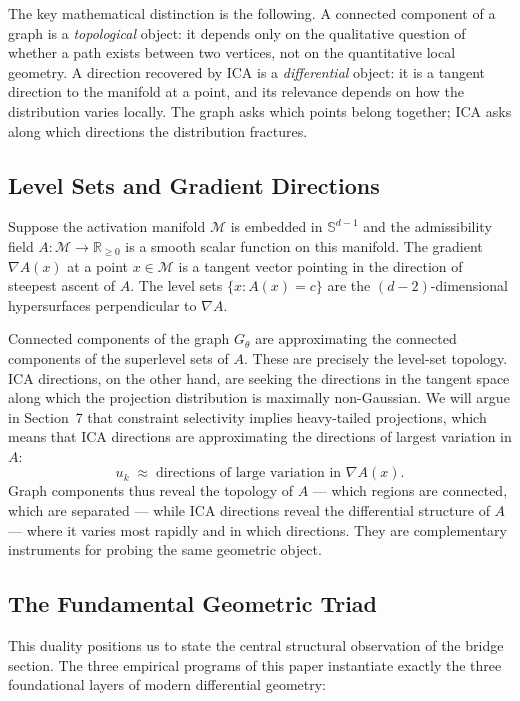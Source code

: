 \documentclass[12pt, a4paper]{article}
\theoremstyle{plain}
\theoremstyle{definition}
\theoremstyle{remark}
\newcommand{\R}{\mathbb{R}}
\newcommand{\Sph}{\mathbb{S}}
\newcommand{\cM}{\mathcal{M}}
\newcommand{\fA}{A}
\begin{document}
The key mathematical distinction is the following. A connected component of a
graph is a \emph{topological} object: it depends only on the qualitative
question of whether a path exists between two vertices, not on the quantitative
local geometry. A direction recovered by ICA is a \emph{differential} object:
it is a tangent direction to the manifold at a point, and its relevance depends
on how the distribution varies locally. The graph asks which points belong
together; ICA asks along which directions the distribution fractures.

\subsection{Level Sets and Gradient Directions}

Suppose the activation manifold $\cM$ is embedded in $\Sph^{d-1}$ and the
admissibility field $\fA : \cM \to \R_{\geq 0}$ is a smooth scalar function
on this manifold. The gradient $\nabla \fA(x)$ at a point $x \in \cM$ is a
tangent vector pointing in the direction of steepest ascent of $\fA$. The
level sets $\{x : \fA(x) = c\}$ are the $(d-2)$-dimensional hypersurfaces
perpendicular to $\nabla \fA$.

Connected components of the graph $G_\theta$ are approximating the connected
components of the superlevel sets of $\fA$. These are precisely the level-set
topology. ICA directions, on the other hand, are seeking the directions in
the tangent space along which the projection distribution is maximally
non-Gaussian. We will argue in Section~7 that constraint selectivity implies
heavy-tailed projections, which means that ICA directions are approximating
the directions of largest variation in $\fA$:
\begin{equation}
  u_k \;\approx\; \text{directions of large variation in } \nabla \fA(x).
\end{equation}
Graph components thus reveal the topology of $\fA$ --- which regions are
connected, which are separated --- while ICA directions reveal the differential
structure of $\fA$ --- where it varies most rapidly and in which directions.
They are complementary instruments for probing the same geometric object.

\subsection{The Fundamental Geometric Triad}

This duality positions us to state the central structural observation of the
bridge section. The three empirical programs of this paper instantiate exactly
the three foundational layers of modern differential geometry:
\end{document}
